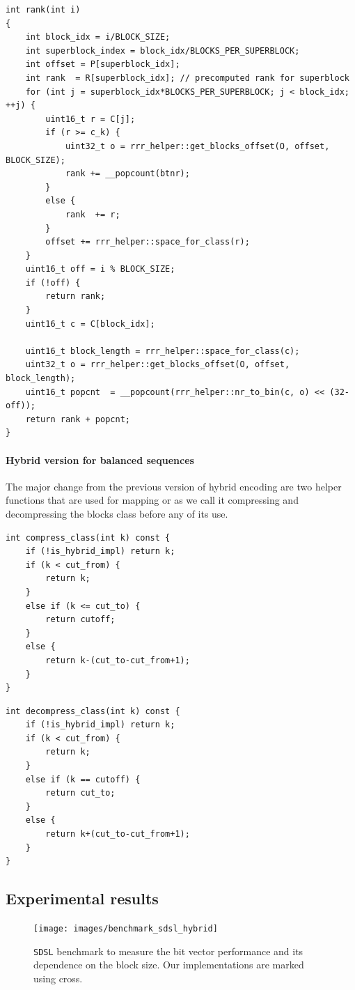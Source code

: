 \begin{lstlisting}
int rank(int i)
{
	int block_idx = i/BLOCK_SIZE;
	int superblock_index = block_idx/BLOCKS_PER_SUPERBLOCK;
	int offset = P[superblock_idx];
	int rank  = R[superblock_idx]; // precomputed rank for superblock
	for (int j = superblock_idx*BLOCKS_PER_SUPERBLOCK; j < block_idx; ++j) {
		uint16_t r = C[j];
		if (r >= c_k) {
			uint32_t o = rrr_helper::get_blocks_offset(O, offset, BLOCK_SIZE);
			rank += __popcount(btnr);
		}
		else {
			rank  += r;
		}
		offset += rrr_helper::space_for_class(r);
	}
	uint16_t off = i % BLOCK_SIZE;
	if (!off) {
		return rank;
	}
	uint16_t c = C[block_idx];

	uint16_t block_length = rrr_helper::space_for_class(c);
	uint32_t o = rrr_helper::get_blocks_offset(O, offset, block_length);
	uint16_t popcnt  = __popcount(rrr_helper::nr_to_bin(c, o) << (32-off));
	return rank + popcnt;
}
\end{lstlisting}

\paragraph{Hybrid version for balanced sequences}

The major change from the previous version of hybrid encoding are two helper
functions that are used for mapping or as we call it compressing and decompressing
the blocks class before any of its use.

\begin{lstlisting}
int compress_class(int k) const {
	if (!is_hybrid_impl) return k;
	if (k < cut_from) {
		return k;
	}
	else if (k <= cut_to) {
		return cutoff;
	}
	else {
		return k-(cut_to-cut_from+1);
	}
}
\end{lstlisting}

\begin{lstlisting}
int decompress_class(int k) const {
	if (!is_hybrid_impl) return k;
	if (k < cut_from) {
		return k;
	}
	else if (k == cutoff) {
		return cut_to;
	}
	else {
		return k+(cut_to-cut_from+1);
	}
}
\end{lstlisting}

\subsection{Experimental results}

\begin{figure}
	\centerline{
		\texttt{[image: images/benchmark\_sdsl\_hybrid]}
	}
	\caption[TODO]{\texttt{SDSL} benchmark to measure the bit vector performance and its dependence
	on the block size. Our implementations are marked using cross.
	}
	\label{obr:benchmark_sdsl_hybrid}
\end{figure}

